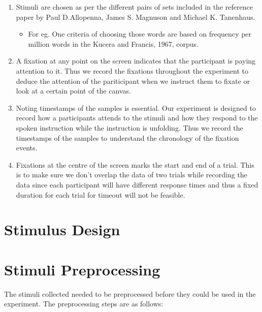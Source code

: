 \documentclass[
  a4paper,
]{article}
\providecommand{\tightlist}{%
  \setlength{\itemsep}{0pt}\setlength{\parskip}{0pt}}\usepackage{longtable,booktabs,array}
\begin{document}
\begin{enumerate}
\def\labelenumi{\arabic{enumi}.}
\item
  Stimuli are chosen as per the different pairs of sets included in the
  reference paper by Paul D.Allopenna, James S. Magnuson and Michael K.
  Tanenhaus.

  \begin{itemize}
  \tightlist
  \item
    For eg. One criteria of choosing those words are based on frequency
    per million words in the Kucera and Francis, 1967, corpus.
  \end{itemize}
\item
  A fixation at any point on the screen indicates that the participant
  is paying attention to it. Thus we record the fixations throughout the
  experiment to deduce the attention of the pariticipant when we
  instruct them to fixate or look at a certain point of the canvas.
\item
  Noting timestamps of the samples is essential. Our experiment is
  designed to record how a participants attends to the stimuli and how
  they respond to the spoken instruction while the instruction is
  unfolding. Thus we record the timestamps of the samples to understand
  the chronology of the fixation events.
\item
  Fixations at the centre of the screen marks the start and end of a
  trial. This is to make sure we don't overlap the data of two trials
  while recording the data since each participant will have different
  response times and thus a fixed duration for each trial for timeout
  will not be feasible.
\end{enumerate}

\hypertarget{stimulus-design}{%
\section{Stimulus Design}\label{stimulus-design}}

\hypertarget{stimuli-preprocessing}{%
\section{Stimuli Preprocessing}\label{stimuli-preprocessing}}

The stimuli collected needed to be preprocessed before they could be
used in the experiment. The preprocessing steps are as follows:
\end{document}
